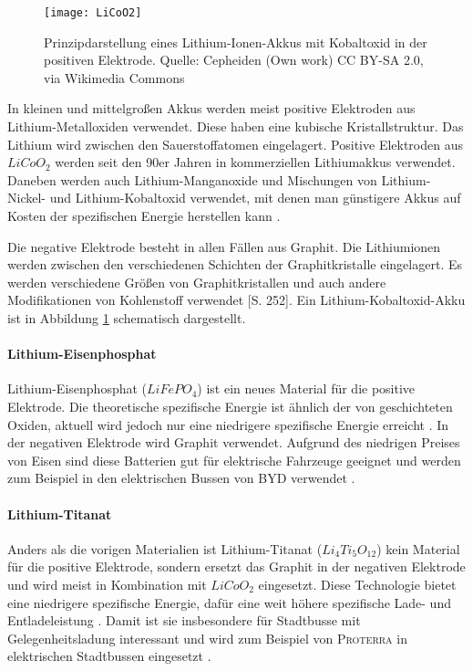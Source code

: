 \begin{figure}\centering
	\texttt{[image: LiCoO2]}
	\caption{Prinzipdarstellung eines Lithium-Ionen-Akkus mit Kobaltoxid in der positiven Elektrode. Quelle: Cepheiden (Own work) CC BY-SA 2.0, via Wikimedia Commons} %
	\label{abb_LiCoO2}
\end{figure}

In kleinen und mittelgroßen Akkus werden meist positive Elektroden aus Lithium-Metalloxiden verwendet. Diese haben eine kubische Kristallstruktur. Das Lithium wird zwischen den Sauerstoffatomen eingelagert. Positive Elektroden aus $LiCoO_2$ werden seit den 90er Jahren in kommerziellen Lithiumakkus verwendet. Daneben werden auch Lithium-Manganoxide und Mischungen von Lithium-Nickel- und Lithium-Kobaltoxid verwendet, mit denen man günstigere Akkus auf Kosten der spezifischen Energie herstellen kann \cite{whittingham2004lithium}. %

Die negative Elektrode besteht in allen Fällen aus Graphit. Die Lithiumionen werden zwischen den verschiedenen Schichten der Graphitkristalle eingelagert. Es werden verschiedene Größen von Graphitkristallen und auch andere Modifikationen von Kohlenstoff verwendet \cite{Sterner:2014}[S. 252]. Ein Lithium-Kobaltoxid-Akku ist in Abbildung \ref{abb_LiCoO2} schematisch dargestellt.

\paragraph{Lithium-Eisenphosphat}
Lithium-Eisenphosphat ($LiFePO_4$) ist ein neues Material für die positive Elektrode. Die theoretische spezifische Energie ist ähnlich der von geschichteten Oxiden, aktuell wird jedoch nur eine niedrigere spezifische Energie erreicht \cite{Tie201382}. In der negativen Elektrode wird Graphit verwendet. Aufgrund des niedrigen Preises von Eisen sind diese Batterien gut für elektrische Fahrzeuge geeignet und werden zum Beispiel in den elektrischen Bussen von \textsc{BYD} verwendet \cite{bydSpecs}.

\paragraph{Lithium-Titanat}
Anders als die vorigen Materialien ist Lithium-Titanat ($Li_4Ti_5O_{12}$) kein Material für die positive Elektrode, sondern ersetzt das Graphit in der negativen Elektrode und wird meist in Kombination mit $LiCoO_2$ eingesetzt. Diese Technologie bietet eine niedrigere spezifische Energie, dafür eine weit höhere spezifische Lade- und Entladeleistung \cite{veneri2012charging}. Damit ist sie insbesondere für Stadtbusse mit Gelegenheitsladung interessant und wird zum Beispiel von \textsc{Proterra} in elektrischen Stadtbussen eingesetzt \cite{protCat}. 

